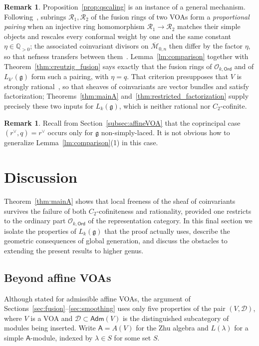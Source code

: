 \documentclass[12pt,a4paper,reqno]{amsart}
\numberwithin{equation}{section}
\theoremstyle{definition}
\newtheorem{remark}[theorem]{Remark}
\newcommand{\g}{\mathfrak{g}}
\newcommand{\Q}{\mathbb{Q}}
\newcommand{\M}{\mathcal{M}}
\def\O{\mathcal{O}}
\def\Ord{\mathsf{Ord}}
\def\Adm{\mathsf{Adm}}
\def\ra{\rightarrow}
\def\A{\mathsf{A}}
\begin{document}
\begin{remark}\label{rmk:proportional}
Proposition~\ref{prop:qscaling} is an instance of a general mechanism. Following~\cite[Definition 3.7]{Chakravarty25}, subrings $\mathcal{R}_1,\mathcal{R}_2$ of the fusion rings of two VOAs form a \emph{proportional pairing} when an injective ring homomorphism $\mathcal{R}_1\ra\mathcal{R}_2$ matches their simple objects and rescales every conformal weight by one and the same constant $\eta\in\Q_{>0}$; the associated coinvariant divisors on $\overline{\M}_{0,n}$ then differ by the factor $\eta$, so that nefness transfers between them~\cite[Theorem 3.8]{Chakravarty25}. Lemma~\ref{lm:comparison} together with Theorem~\ref{thm:creutzig_fusion} says exactly that the fusion rings of $\O_{k,\Ord}$ and of $L_{k'}(\g)$ form such a pairing, with $\eta=q$. That criterion presupposes that $V$ is strongly rational~\cite[Assumption 3.1]{Chakravarty25}, so that sheaves of coinvariants are vector bundles and satisfy factorization; Theorems~\ref{thm:mainA} and~\ref{thm:restricted_factorization} supply precisely these two inputs for $L_k(\g)$, which is neither rational nor $C_2$-cofinite.
\end{remark}

\begin{remark}\label{rmk:qscaling_scope}
Recall from Section~\ref{subsec:affineVOA} that the coprincipal case $(r^\vee,q)=r^\vee$ occurs only for $\g$ non-simply-laced. It is not obvious how to generalize Lemma~\ref{lm:comparison}(1) in this case.
\end{remark}

\section{Discussion}\label{sec:discussion}

Theorem~\ref{thm:mainA} shows that local freeness of the sheaf of coinvariants survives the failure of both $C_2$-cofiniteness and rationality, provided one restricts to the ordinary part $\O_{k,\Ord}$ of the representation category. In this final section we isolate the properties of $L_k(\g)$ that the proof actually uses, describe the geometric consequences of global generation, and discuss the obstacles to extending the present results to higher genus.

\subsection{Beyond affine VOAs}\label{subsec:axioms}
Although stated for admissible affine VOAs, the argument of Sections~\ref{sec:fusion}--\ref{sec:smoothing} uses only five properties of the pair $(V,\mathcal{D})$, where $V$ is a VOA and $\mathcal{D}\subset \Adm(V)$ is the distinguished subcategory of modules being inserted. Write $\A=A(V)$ for the Zhu algebra and $L(\lambda)$ for a simple $\A$-module, indexed by $\lambda\in S$ for some set $S$.
\end{document}
